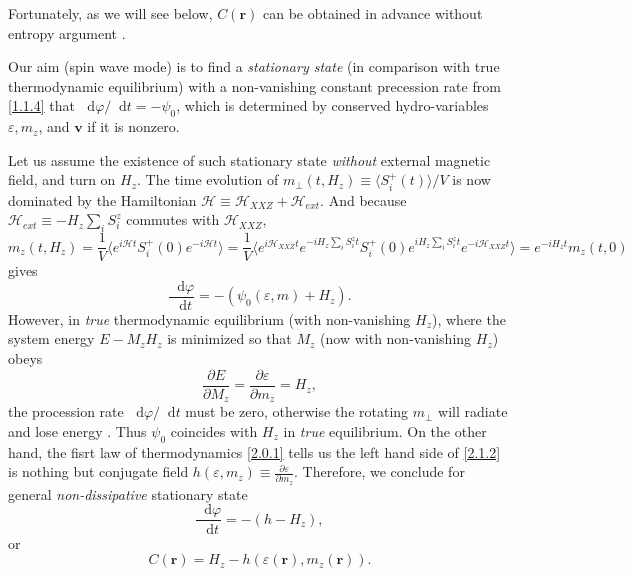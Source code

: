 \documentclass[10pt,nofootinbib,letterpaper]{revtex4}
\newcommand*\dd{\mathop{}\!\mathrm{d}}
\begin{document}
			Fortunately, as we will see below, $C(\bm{r})$ can be obtained in advance without entropy argument \cite{chaikin2000principles,halperin1969hydrodynamic}.\par
			Our aim (spin wave mode) is to find a \emph{stationary state} (in comparison with true thermodynamic equilibrium) with a non-vanishing constant precession rate from \eqref{1.1.4} that $\dd\varphi/\dd t=-\psi_0$, which is determined by conserved hydro-variables $\varepsilon,m_z$, and $\bm{v}$ if it is nonzero.\par
			Let us assume the existence of such stationary state \emph{without} external magnetic field, and turn on $H_z$. The time evolution of $m_\perp(t,H_z)\equiv\langle S_i^+(t)\rangle/V$ is now dominated by the Hamiltonian $\mathcal{H}\equiv\mathcal{H}_{XXZ}+\mathcal{H}_{ext}$. And because $\mathcal{H}_{ext}\equiv-H_z\sum_i S_i^z$ commutes with $\mathcal{H}_{XXZ}$,
			\begin{equation*}
				m_z(t,H_z)=\dfrac{1}{V}\bigg\langle e^{i\mathcal{H}t}S_i^+(0)e^{-i\mathcal{H}t}\bigg\rangle=\dfrac{1}{V}\bigg\langle e^{i\mathcal{H}_{XXZ}t}e^{-iH_z\sum_iS_i^zt}S_i^+(0)e^{iH_z\sum_iS_i^zt}e^{-i\mathcal{H}_{XXZ}t}\bigg\rangle=e^{-iH_zt}m_z(t,0)
			\end{equation*}
			gives
			\begin{equation*}
				\dfrac{\dd\varphi}{\dd t}=-(\psi_0(\varepsilon,m)+H_z).
			\end{equation*}
			However, in \emph{true} thermodynamic equilibrium (with non-vanishing $H_z$), where the system energy $E-M_z H_z$ is minimized so that $M_z$ (now with non-vanishing $H_z$) obeys
			\begin{equation}\label{2.1.2}
				\dfrac{\partial E}{\partial M_z}=\dfrac{\partial \varepsilon}{\partial m_z}=H_z,
			\end{equation}
			the procession rate $\dd\varphi/\dd t$ must be zero, otherwise the rotating $m_\perp$ will radiate and lose energy \cite{halperin1969hydrodynamic}. Thus $\psi_0$ coincides with $H_z$ in \emph{true} equilibrium. On the other hand, the fisrt law of thermodynamics \eqref{2.0.1} tells us the left hand side of \eqref{2.1.2} is nothing but conjugate field $h(\varepsilon,m_z)\equiv\frac{\partial \varepsilon}{\partial m_z}$. Therefore, we conclude for general \emph{non-dissipative} stationary state 
			\begin{equation}\label{2.1.3}
				\dfrac{\dd\varphi}{\dd t}=-(h-H_z),
			\end{equation}
			or
			\begin{equation}\label{2.1.4}
				C(\bm{r})=H_z-h(\varepsilon(\bm{r}),m_z(\bm{r})).
			\end{equation}
\end{document}
